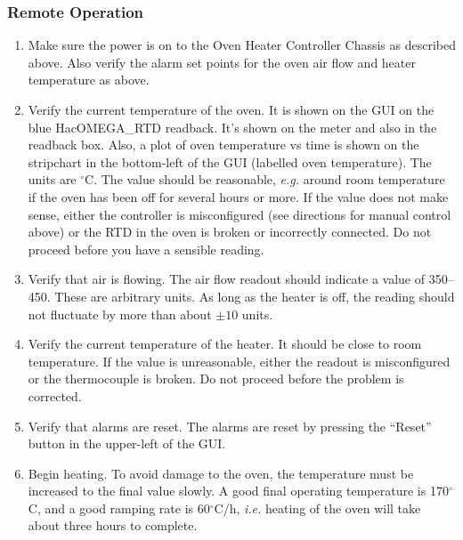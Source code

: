 {\subsubsection{Remote Operation}
\begin{enumerate}
\item Make sure the power is on to the Oven Heater Controller
Chassis as described above.  Also verify the alarm set points
for the oven air flow and heater temperature as above.  
\item Verify the current temperature of the oven.  It is shown
on the GUI on the blue HacOMEGA\_RTD readback.  It's shown on 
the meter and also in the readback box.  Also, a plot of oven temperature
vs time is shown on the stripchart in the bottom-left of the GUI 
(labelled oven temperature).  The units are $^\circ$C. 
The value should be reasonable,  {\it e.g.}\/ around room temperature 
if the oven has been off for several hours or more. If the value 
does not make sense, either the controller is misconfigured (see 
directions for manual control above) or the RTD in the oven is 
broken or incorrectly connected.  Do not proceed before you have 
a sensible reading.
\item Verify that air is flowing. The air flow readout should indicate
  a value of 350--450. These are arbitrary units. As long as the heater is
  off, the reading should not fluctuate by more than about $\pm 10$ units.
\item Verify the current temperature of the heater. It should be
  close to room temperature. If the value is unreasonable, either
  the readout is misconfigured or the thermocouple is broken.
  Do not proceed before the problem is corrected.
\item Verify that alarms are reset.  The alarms are reset by pressing
the ``Reset'' button in the upper-left of the GUI.  
\item Begin heating.  To avoid damage to the oven, the temperature 
must be increased to the final value slowly. A good final operating 
temperature is 170$^\circ$C, and a good ramping rate is 60$^\circ$C/h, 
{\it i.e.\/} heating of the oven will take about three hours to complete.


\end{enumerate}}
